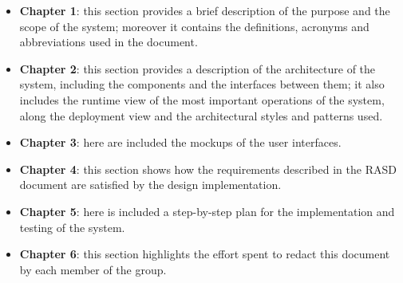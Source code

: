 \begin{itemize}
    \item \textbf{Chapter 1}: this section provides a brief description of the purpose and the scope of the system; moreover it contains the definitions, acronyms and abbreviations used in the document.
    \item \textbf{Chapter 2}: this section provides a description of the architecture of the system, including the components and the interfaces between them; it also includes the runtime view of the most important operations of the system, along the deployment view and the architectural styles and patterns used.
    \item \textbf{Chapter 3}: here are included the mockups of the user interfaces.
    \item \textbf{Chapter 4}: this section shows how the requirements described in the RASD document are satisfied by the design implementation.
    \item \textbf{Chapter 5}: here is included a step-by-step plan for the implementation and testing of the system.
    \item \textbf{Chapter 6}: this section highlights the effort spent to redact this document by each member of the group.
\end{itemize}

